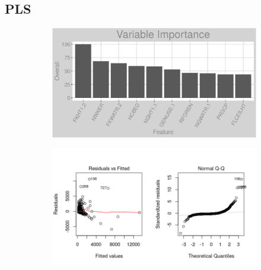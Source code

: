 \subsection{PLS}
\label{appendix:fuel_oil:pls}
\begin{figure}[h]
\centering
\begin{subfigure}{1\textwidth}
\centering
\includegraphics[width=.99\textwidth, height=0.3\textheight]{Images/fuel_oil_pls_vars.png}
\end{subfigure}
\begin{subfigure}{1\textwidth}
\centering
\includegraphics[width=.99\textwidth, height=0.475\textheight]{Images/fuel_oil_pls_res_1.png}
\end{subfigure}
\end{figure}
\FloatBarrier
\newpage
